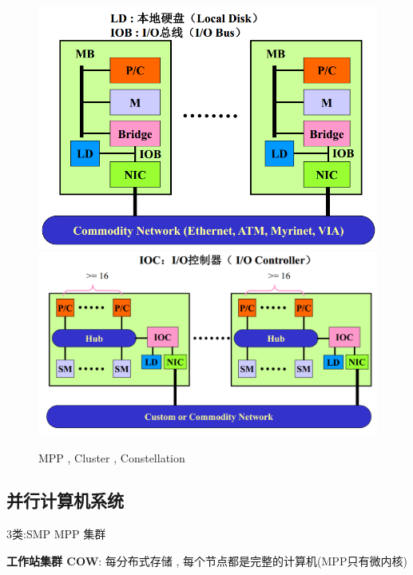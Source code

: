 \documentclass[UTF8,a4paper]{ctexart}
\begin{document}
\begin{itemize}
\begin{figure}[H]
      \includegraphics[scale = 0.2]{assets/ParallelComputing_3eb47.png}
      \includegraphics[scale = 0.3]{assets/ParallelComputing_04d17.png}
      \caption{MPP , Cluster , Constellation}
    \end{figure}
  \end{itemize}

  \subsection{并行计算机系统}
  3类:SMP MPP 集群

  \textbf{工作站集群 COW}: 每分布式存储 , 每个节点都是完整的计算机(MPP只有微内核)
\end{document}
